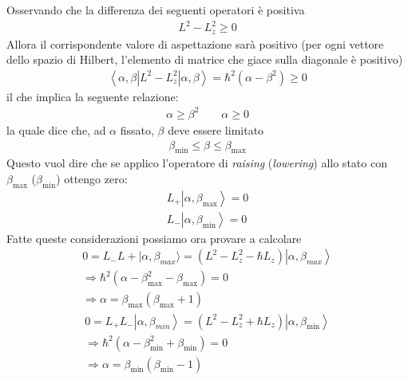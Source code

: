 Osservando che la differenza dei seguenti operatori è positiva
\begin{equation}\begin{split}
L^2-L_z^2 \ge 0\end{split}\end{equation} 
Allora il corrispondente valore di aspettazione sarà positivo (per ogni vettore dello spazio di Hilbert, l'elemento di matrice che giace sulla diagonale è positivo)
\begin{equation}\begin{split}
\left\langle \alpha,\beta|L^2-L_z^2|\alpha,\beta \right\rangle=\hbar ^2\left(\alpha-\beta^2\right)\ge 0
\end{split}\end{equation}
il che implica la seguente relazione:
\begin{equation}\begin{split}
\alpha\ge\beta^2 \qquad \alpha\ge 0\end{split}\end{equation}
la quale dice che, ad $\alpha$ fissato, $\beta$ deve essere limitato
 \begin{equation}\begin{split}\beta_{\min}\le\beta\le\beta_{\max}\end{split}\end{equation}
Questo vuol dire che se applico l'operatore di \textit{raising} (\textit{lowering}) allo stato con $\beta_{\max}$ ($\beta_{\min}$) ottengo zero:
\begin{equation}\begin{split}
L_+\left |\alpha,\beta_{\max} \right\rangle=0 \\
L_-\left |\alpha,\beta_{\min} \right\rangle=0
\end{split}\end{equation}
Fatte queste considerazioni possiamo ora provare a calcolare
\begin{equation}\begin{split}
0=L_-L+|\alpha,\beta_{max}\rangle=\left(L^2-L_z^2-\hbar L_z\right)\left |\alpha,\beta_{max} \right\rangle\\
\Longrightarrow \hbar ^2\left(\alpha-\beta_{\max}^2-\beta_{\max}\right)=0 \\
\Longrightarrow \alpha=\beta_{\max}\left(\beta_{\max}+1\right)
\end{split}\end{equation}
\begin{equation}\begin{split}
0=L_+L_-\left |\alpha,\beta_{min} \right\rangle=\left(L^2-L_z^2+\hbar L_z\right)\left |\alpha,\beta_{\min} \right\rangle \\
\Longrightarrow \hbar ^2\left(\alpha-\beta_{\min}^2+\beta_{\min}\right)=0 \\
\Longrightarrow \alpha=\beta_{\min}\left(\beta_{\min}-1\right)
\end{split}\end{equation}
